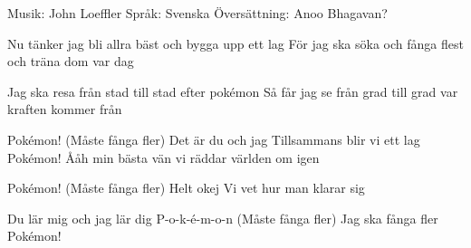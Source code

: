 \begin{song}


\begin{songmeta}
Musik: John Loeffler
Språk: Svenska
Översättning: Anoo Bhagavan?
\end{songmeta}

\begin{songtext}
Nu tänker jag bli allra bäst
och bygga upp ett lag
För jag ska söka och fånga flest
och träna dom var dag

Jag ska resa från stad till stad
efter pokémon
Så får jag se från grad till grad
var kraften kommer från

Pokémon! (Måste fånga fler)
Det är du och jag
Tillsammans blir vi ett lag
Pokémon!
Ååh min bästa vän vi räddar världen om igen

Pokémon! (Måste fånga fler)
Helt okej
Vi vet hur man klarar sig

Du lär mig och jag lär dig
P-o-k-é-m-o-n (Måste fånga fler)
Jag ska fånga fler
Pokémon!
\end{songtext}

\end{song}
